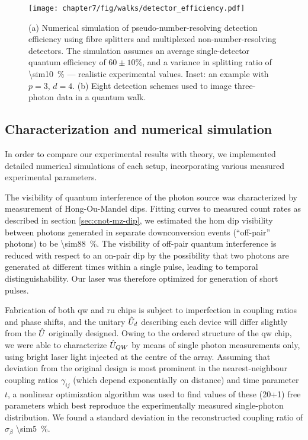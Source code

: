 \begin{figure}[t!]
\centering
\texttt{[image: chapter7/fig/walks/detector\_efficiency.pdf]}
\caption[Detection efficiency of multiplexed pseudo-number-resolving detectors]{
(a) Numerical simulation of pseudo-number-resolving detection efficiency using fibre splitters and multiplexed non-number-resolving detectors. The simulation assumes an average single-detector quantum efficiency of $60\pm 10\%$, and a variance in splitting ratio of \SI{\sim10}{\percent} --- realistic experimental values. Inset: an example with $p=3$, $d=4$. (b) Eight detection schemes used to image three-photon data in a quantum walk.} 
\label{fig:detector-multiplexing}
\end{figure}


\subsection{Characterization and numerical simulation} 
In order to compare our experimental results with theory, we implemented detailed numerical simulations of each setup, incorporating various measured experimental parameters. 

The visibility of quantum interference of the photon source was characterized by measurement of Hong-Ou-Mandel dips. Fitting curves to measured count rates as described in section \ref{sec:cnot-mz-dip}, we estimated the \gls{hom} dip visibility between photons generated in separate downconversion events (``off-pair'' photons) to be \SI{\sim88}{\percent}. The visibility of off-pair quantum interference is reduced with respect to an on-pair dip by the possibility that two photons are generated at different times within a single pulse, leading to temporal distinguishability. Our laser was therefore optimized for generation of short pulses.

Fabrication of both \gls{qw} and \gls{ru} chips is subject to imperfection in coupling ratios and phase shifts, and the unitary $\hat{U}_d$ describing each device will differ slightly from the $\hat{U}$ originally designed. Owing to the ordered structure of the \gls{qw} chip, we were able to characterize $\hat{U}_{QW}$ by means of single photon measurements only, using bright laser light injected at the centre of the array. Assuming that deviation from the original design is most prominent in the nearest-neighbour coupling ratios $\gamma_{ij}$ (which depend exponentially on distance) and time parameter $t$, a nonlinear optimization algorithm was used to find values of these (20+1) free parameters which best reproduce the experimentally measured single-photon distribution. We found a standard deviation in the reconstructed coupling ratio of $\sigma_\beta$ \SI{\sim5}{\percent}.

